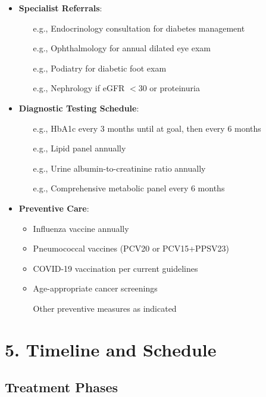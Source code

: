 \documentclass[11pt,letterpaper]{article}
\begin{document}
\begin{itemize}[leftmargin=*]
    \item \textbf{Specialist Referrals}:
    \begin{itemize}
        \item [e.g., Endocrinology consultation for diabetes management]
        \item [e.g., Ophthalmology for annual dilated eye exam]
        \item [e.g., Podiatry for diabetic foot exam]
        \item [e.g., Nephrology if eGFR $<$30 or proteinuria]
    \end{itemize}

    \item \textbf{Diagnostic Testing Schedule}:
    \begin{itemize}
        \item [e.g., HbA1c every 3 months until at goal, then every 6 months]
        \item [e.g., Lipid panel annually]
        \item [e.g., Urine albumin-to-creatinine ratio annually]
        \item [e.g., Comprehensive metabolic panel every 6 months]
    \end{itemize}

    \item \textbf{Preventive Care}:
    \begin{itemize}
        \item Influenza vaccine annually
        \item Pneumococcal vaccines (PCV20 or PCV15+PPSV23)
        \item COVID-19 vaccination per current guidelines
        \item Age-appropriate cancer screenings
        \item [Other preventive measures as indicated]
    \end{itemize}
\end{itemize}

\section*{5. Timeline and Schedule}

\subsection*{Treatment Phases}
\end{document}
